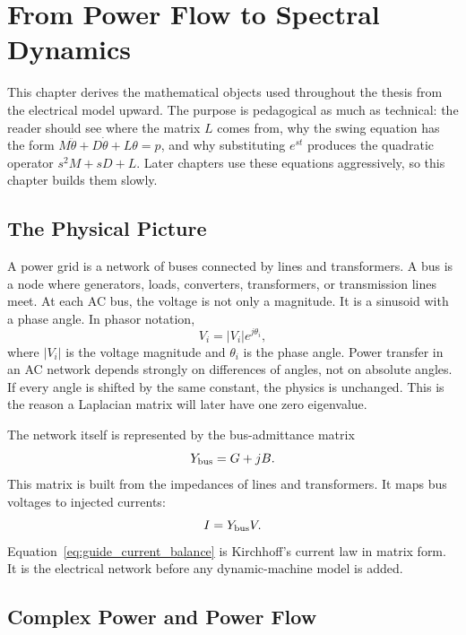 \chapter{From Power Flow to Spectral Dynamics}

This chapter derives the mathematical objects used throughout the thesis from
the electrical model upward. The purpose is pedagogical as much as technical:
the reader should see where the matrix \(L\) comes from, why the swing equation
has the form \(M\ddot\theta+D\dot\theta+L\theta=p\), and why substituting
\(e^{st}\) produces the quadratic operator \(s^2M+sD+L\). Later chapters use
these equations aggressively, so this chapter builds them slowly.

\section{The Physical Picture}

A power grid is a network of buses connected by lines and transformers. A bus
is a node where generators, loads, converters, transformers, or transmission
lines meet. At each AC bus, the voltage is not only a magnitude. It is a
sinusoid with a phase angle. In phasor notation,
\begin{equation}
  V_i=|V_i|e^{j\theta_i},
  \label{eq:guide_voltage_phasor}
\end{equation}
where \(|V_i|\) is the voltage magnitude and \(\theta_i\) is the phase angle.
Power transfer in an AC network depends strongly on differences of angles,
not on absolute angles. If every angle is shifted by the same constant, the
physics is unchanged. This is the reason a Laplacian matrix will later have
one zero eigenvalue.

The network itself is represented by the bus-admittance matrix
\begin{equation}
  Y_{\rm bus}=G+jB.
  \label{eq:guide_ybus}
\end{equation}
This matrix is built from the impedances of lines and transformers. It maps
bus voltages to injected currents:
\begin{equation}
  I=Y_{\rm bus}V.
  \label{eq:guide_current_balance}
\end{equation}
Equation~\eqref{eq:guide_current_balance} is Kirchhoff's current law in matrix
form. It is the electrical network before any dynamic-machine model is added.

\section{Complex Power and Power Flow}

